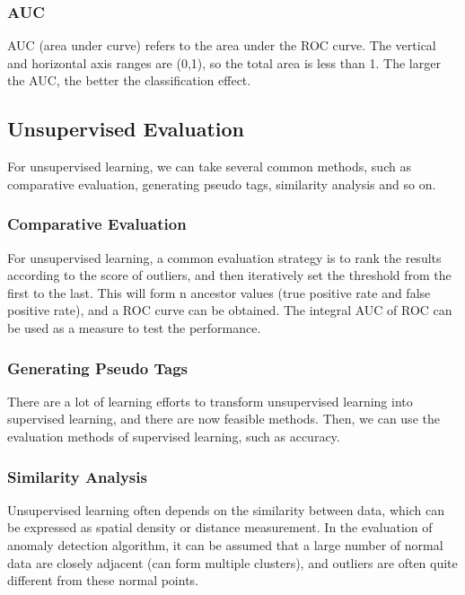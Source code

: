 \subsubsection{AUC}
AUC (area under curve) refers to the area under the ROC curve.
The vertical and horizontal axis ranges are (0,1),
 so the total area is less than 1.
 The larger the AUC,
 the better the classification effect.
\subsection{Unsupervised Evaluation}

For unsupervised learning,
we can take several common methods,
such as comparative evaluation,
generating pseudo tags,
similarity analysis and so on.

\subsubsection{Comparative Evaluation}

For unsupervised learning, 
a common evaluation strategy is to rank the 
results according to the score of outliers, 
and then iteratively set the threshold from 
the first to the last. 
This will form n ancestor values 
(true positive rate and false positive rate), 
and a ROC curve can be obtained. 
The integral AUC of ROC can be used as a measure 
to test the performance.


\subsubsection{Generating Pseudo Tags}

There are a lot of learning efforts to transform 
unsupervised learning into supervised learning, 
and there are now feasible methods. 
Then, 
we can use the evaluation methods of supervised learning, 
such as accuracy.

\subsubsection{Similarity Analysis}

Unsupervised learning often depends 
on the similarity between data, 
which can be expressed as spatial density 
or distance measurement. 
In the evaluation of anomaly detection algorithm, 
it can be assumed that a large number of normal 
data are closely adjacent (can form multiple clusters), 
and outliers are often quite different from these normal points.

